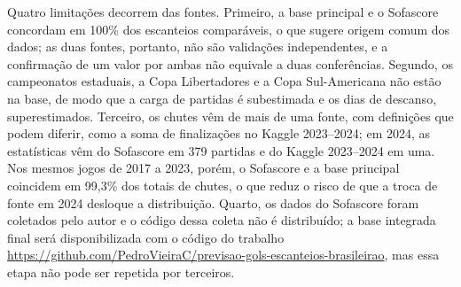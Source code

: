 Quatro limitações decorrem das fontes. Primeiro, a base principal e o Sofascore concordam em 100\% dos escanteios comparáveis, o que sugere origem comum dos dados; as duas fontes, portanto, não são validações independentes, e a confirmação de um valor por ambas não equivale a duas conferências. Segundo, os campeonatos estaduais, a Copa Libertadores e a Copa Sul-Americana não estão na base, de modo que a carga de partidas é subestimada e os dias de descanso, superestimados. Terceiro, os chutes vêm de mais de uma fonte, com definições que podem diferir, como a soma de finalizações no Kaggle 2023--2024; em 2024, as estatísticas vêm do Sofascore em 379 partidas e do Kaggle 2023--2024 em uma. Nos mesmos jogos de 2017 a 2023, porém, o Sofascore e a base principal coincidem em 99,3\% dos totais de chutes, o que reduz o risco de que a troca de fonte em 2024 desloque a distribuição. Quarto, os dados do Sofascore foram coletados pelo autor e o código dessa coleta não é distribuído; a base integrada final será disponibilizada com o código do trabalho \url{https://github.com/PedroVieiraC/previsao-gols-escanteios-brasileirao}, mas essa etapa não pode ser repetida por terceiros.
